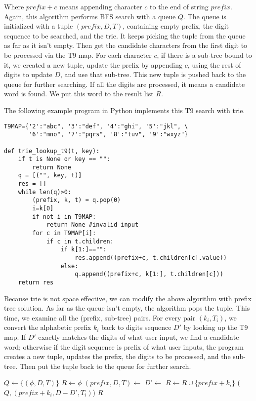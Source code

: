 \documentclass{article}
\begin{document}
Where $prefix + c$ means appending character $c$ to the end of string $prefix$.
Again, this algorithm performs BFS search with a queue $Q$. The queue is
initialized with a tuple $(prefix, D, T)$, containing empty prefix, the digit sequence to be
searched, and the trie. It keeps picking the tuple from the queue as far as
it isn't empty. Then get the candidate characters from the first digit to
be processed via the T9 map. For each character $c$, if there is a sub-tree
bound to it, we created a new tuple, update the prefix by appending $c$,
using the rest of digits to update $D$, and use that sub-tree. This new tuple
is pushed back to the queue for further searching. If all the digits are
processed, it means a candidate word is found. We put this word to the
result list $R$.

The following example program in Python implements this T9 search with trie.

\lstset{language=Python}
\begin{lstlisting}
T9MAP={'2':"abc", '3':"def", '4':"ghi", '5':"jkl", \
       '6':"mno", '7':"pqrs", '8':"tuv", '9':"wxyz"}

def trie_lookup_t9(t, key):
    if t is None or key == "":
        return None
    q = [("", key, t)]
    res = []
    while len(q)>0:
        (prefix, k, t) = q.pop(0)
        i=k[0]
        if not i in T9MAP:
            return None #invalid input
        for c in T9MAP[i]:
            if c in t.children:
                if k[1:]=="":
                    res.append((prefix+c, t.children[c].value))
                else:
                    q.append((prefix+c, k[1:], t.children[c]))
    return res
\end{lstlisting}

Because trie is not space effective, we can modify the above algorithm with
prefix tree solution. As far as the queue isn't empty, the algorithm pops the
tuple. This time, we examine all the (prefix, sub-tree) pairs. For every pair
$(k_i, T_i)$, we convert the alphabetic prefix $k_i$ back to digits sequence $D'$
by looking up the T9 map. If $D'$ exactly matches the digits of what user input,
we find a candidate word; otherwise if the digit sequence is prefix of what user inputs,
the program creates a new tuple, updates the prefix, the digits to be processed,
and the sub-tree. Then put the tuple back to the queue for further search.

\begin{algorithmic}[1]
  \State $Q \gets \{(\phi, D, T)\}$
  \State $R \gets \phi$
    \State $(prefix, D, T) \gets$ 
      \State $D' \gets$ 
       
          \State $R \gets R \cup \{prefix + k_i\}$
        \Else
          \State {}($Q, (prefix + k_i, D - D', T_i)$)
        \EndIf
      \EndIf
    \EndFor
  \EndWhile
  \State \Return $R$
\EndFunction
\end{algorithmic}
\end{document}
